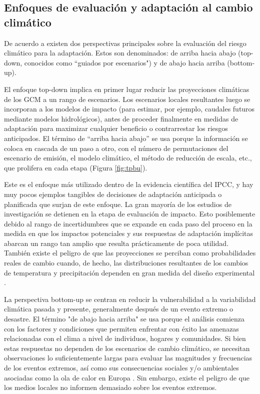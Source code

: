 \documentclass[12pt]{article}
\begin{document}
\subsection{Enfoques de evaluación y adaptación al cambio climático}

De acuerdo a \citet{Wilby2010} existen dos perspectivas principales sobre la evaluación del riesgo climático para la adaptación. Estos son denominados: de arriba hacia abajo (top-down, conocidos como ``guiados por escenarios") y de abajo hacia arriba (bottom-up).

El enfoque top-down implica en primer lugar reducir las proyecciones climáticas de los GCM a un rango de escenarios. Los escenarios locales resultantes luego se incorporan a los modelos de impacto (para estimar, por ejemplo, caudales futuros mediante modelos hidrológicos), antes de proceder finalmente en medidas de adaptación para maximizar cualquier beneficio o contrarrestar los riesgos anticipados. El término de “arriba hacia abajo” se usa porque la información se coloca en cascada de un paso a otro, con el número de permutaciones del escenario de emisión, el modelo climático, el método de reducción de escala, etc., que prolifera en cada etapa (Figura \ref{fig:tpbu}). 

Este es el enfoque más utilizado dentro de la evidencia científica del IPCC, y hay muy pocos ejemplos tangibles de decisiones de adaptación anticipada o planificada que surjan de este enfoque. La gran mayoría de los estudios de investigación se detienen en la etapa de evaluación de impacto. Esto posiblemente debido al rango de incertidumbres que se expande en cada paso del proceso en la medida en que los impactos potenciales y sus respuestas de adaptación implícitas abarcan un rango tan amplio que resulta prácticamente de poca utilidad. También existe el peligro de que las proyecciones se perciban como probabilidades reales de cambio cuando, de hecho, las distribuciones resultantes de los cambios de temperatura y precipitación dependen en gran medida del diseño experimental \citep{Dessai2004}. 



La perspectiva bottom-up se centran en reducir la vulnerabilidad a la variabilidad climática pasada y presente, generalmente después de un evento extremo o desastre. El término "de abajo hacia arriba" se usa porque el análisis comienza con los factores y condiciones que permiten enfrentar con éxito las amenazas relacionadas con el clima a nivel de individuos, hogares y comunidades. Si bien estas respuestas no dependen de los escenarios de cambio climático, se necesitan observaciones lo suficientemente largas para evaluar las magnitudes y frecuencias de los eventos extremos, así como sus consecuencias sociales y/o ambientales asociadas como la ola de calor en Europa \citep{Palutikof2004}. Sin embargo, existe el peligro de que los medios locales no informen demasiado sobre los eventos extremos.
\end{document}
